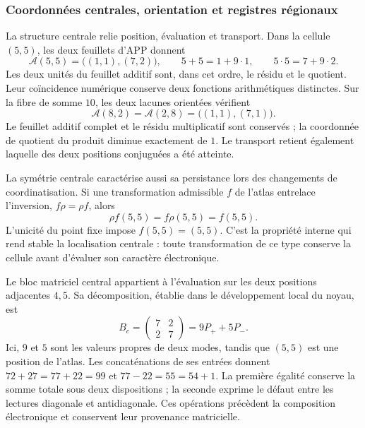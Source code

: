 \subsubsection{Coordonnées centrales, orientation et registres régionaux}
\label{el-centro:registros}

La structure centrale relie position, évaluation et transport. Dans la
cellule \((5,5)\), les deux feuillets d'APP donnent
\begin{equation}
 \mathcal A(5,5)=\bigl((1,1),(7,2)\bigr),\qquad
 5+5=1+9\cdot1,\qquad5\cdot5=7+9\cdot2.
 \label{el-centro:app}
\end{equation}
Les deux unités du feuillet additif sont, dans cet ordre, le résidu et le quotient.
Leur coïncidence numérique conserve deux fonctions arithmétiques distinctes.
Sur la fibre de somme \(10\), les deux lacunes orientées vérifient
\begin{equation}
 \mathcal A(8,2)=\mathcal A(2,8)=\bigl((1,1),(7,1)\bigr).
 \label{el-centro:vacancias}
\end{equation}
Le feuillet additif complet et le résidu multiplicatif sont conservés ;
la coordonnée de quotient du produit diminue exactement de
\(1\). Le transport retient également laquelle des deux positions
conjuguées a été atteinte.



La symétrie centrale caractérise aussi sa persistance lors des changements de
coordinatisation. Si une transformation admissible \(f\) de l'atlas entrelace
l'inversion, \(f\rho=\rho f\), alors
\[
 \rho f(5,5)=f\rho(5,5)=f(5,5).
\]
L'unicité du point fixe impose \(f(5,5)=(5,5)\). C'est la
propriété interne qui rend stable la localisation centrale : toute
transformation de ce type conserve la cellule avant d'évaluer son
caractère électronique.

Le bloc matriciel central appartient à l'évaluation sur les deux
positions adjacentes \(4,5\). Sa décomposition, établie dans le
développement local du noyau, est
\[
 B_c=\begin{pmatrix}7&2\\2&7\end{pmatrix}=9P_++5P_-.
\]
Ici, \(9\) et \(5\) sont les valeurs propres de deux modes, tandis que
\((5,5)\) est une position de l'atlas. Les concaténations de ses
entrées donnent \(72+27=77+22=99\) et
\(77-22=55=54+1\). La première égalité conserve la somme totale sous
deux dispositions ; la seconde exprime le défaut entre les lectures
diagonale et antidiagonale. Ces opérations précèdent la composition
électronique et conservent leur provenance matricielle.

